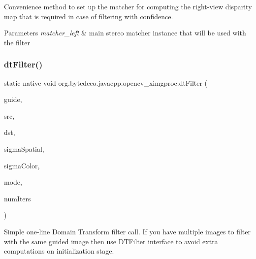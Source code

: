 Convenience method to set up the matcher for computing the right-\/view disparity map that is required in case of filtering with confidence. 


\begin{DoxyParams}{Parameters}
{\em matcher\+\_\+left} & main stereo matcher instance that will be used with the filter \\
\hline
\end{DoxyParams}
\mbox{\label{group__ximgproc__filters_ga7a3f493e82d0571f6a8ed61d005542d9}} 
\subsubsection{\texorpdfstring{dt\+Filter()}{dtFilter()}}
{\footnotesize\ttfamily static native void org.\+bytedeco.\+javacpp.\+opencv\+\_\+ximgproc.\+dt\+Filter (\begin{DoxyParamCaption}\item[{@By\+Val Mat}]{guide,  }\item[{@By\+Val Mat}]{src,  }\item[{@By\+Val Mat}]{dst,  }\item[{double}]{sigma\+Spatial,  }\item[{double}]{sigma\+Color,  }\item[{int}]{mode,  }\item[{int}]{num\+Iters }\end{DoxyParamCaption})\hspace{0.3cm}{\ttfamily [static]}}



Simple one-\/line Domain Transform filter call. If you have multiple images to filter with the same guided image then use D\+T\+Filter interface to avoid extra computations on initialization stage. 


